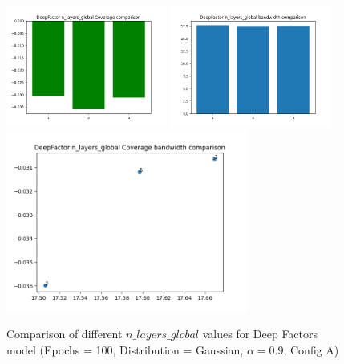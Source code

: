 \documentclass[a4paper, 12pt]{article}
\begin{document}
\begin{figure}[!h]
    \centering
    \includegraphics[width=200px]{plots/hist/a/DeepFactor/n_layers_global/Coverage.png}
    \includegraphics[width=200px]{plots/hist/a/DeepFactor/n_layers_global/bandwidth.png}
    \includegraphics[width=300px]{plots/scatter/a/DeepFactor/n_layers_global/Coverage_bandwidth.png}
    \caption{Comparison of different $n\_layers\_global$ values for Deep Factors model (Epochs = 100, Distribution = Gaussian, $\alpha = 0.9$, Config A)}
    \label{fig:comp_deepfactor_n_layers_global}
\end{figure}
\end{document}
